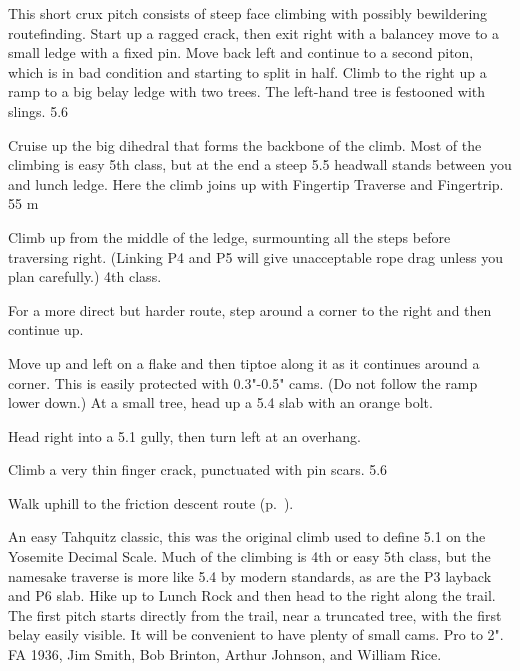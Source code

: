 \documentclass{tahquitz}
\begin{document}
 This short crux pitch consists of steep face climbing with
possibly bewildering routefinding. Start up a ragged crack, then
exit right with a balancey move to a small ledge with a fixed pin.
Move back left and continue to a second piton, which is in bad condition
and starting to split in half. Climb to the right up a ramp to a big belay
ledge with two trees. The left-hand tree is festooned with slings. 5.6

 Cruise up the big dihedral that forms the backbone of the climb.
Most of the climbing is easy 5th class, but at the end a steep 5.5 headwall
stands between you and lunch ledge. Here the climb joins up with Fingertip Traverse
and Fingertrip. 55 m


 Climb up from the middle of the ledge, surmounting all the steps
before traversing right. (Linking P4 and P5 will
give unacceptable rope drag unless you plan carefully.) 4th class.

 For a more direct but harder route, step around a corner
to the right and then continue up.

 Move up and left on a flake
and then tiptoe along it as it continues around a corner.
This is easily protected with 0.3"-0.5" cams. (Do not follow the ramp lower down.) At a small
tree, head up a 5.4 slab with an orange bolt.

 Head right into a 5.1 gully, then turn left at an overhang.

 Climb a very thin finger crack, punctuated with pin scars. 5.6

Walk uphill to the friction descent route  (p.~\pageref{subsec:friction-descent}).



An easy Tahquitz classic, this was the original climb used to define
5.1 on the Yosemite Decimal Scale. Much of the
climbing is 4th or easy 5th class, but the namesake traverse is more
like 5.4 by modern standards, as are the P3 layback and P6 slab.
Hike up to Lunch Rock and then head to the right along the
trail. The first pitch starts directly from the trail, near a 
truncated tree, with the first belay easily visible. It will be
convenient to have plenty of small cams. Pro to 2". FA
1936, Jim Smith, Bob Brinton, Arthur Johnson, and William Rice.
\end{document}
